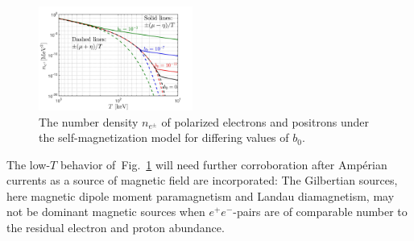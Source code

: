 \documentclass[aps,prd,floatfix,reprint]{revtex4-2}
\newcommand{\rf}[1]{Fig.~{\ref{#1}}}
\begin{document}
\begin{figure}%
 \centering
\includegraphics[width=0.45\textwidth]{plots/ElectronDenisty_SpinChemicalPotential004.jpg}
 \caption{The number density $n_{e^{\pm}}$ of polarized electrons and positrons under the self-magnetization model for differing values of $b_{0}$.}
 \label{fig:polarswap} 
\end{figure}

The low-$T$ behavior of~\rf{fig:polarswap} will need further corroboration after Amp{\'e}rian currents as a source of magnetic field are incorporated: The Gilbertian sources, here magnetic dipole moment paramagnetism and Landau diamagnetism, may not be dominant magnetic sources when $e^{+}e^{-}$-pairs are of comparable number to the residual electron and proton abundance.
\end{document}
